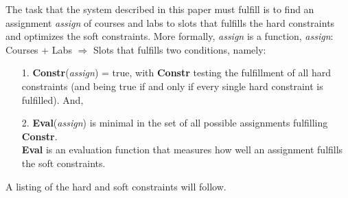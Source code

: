 \documentclass[10pt, oneside]{article}   	%
\begin{document}
\par The task that the system described in this paper must fulfill is to find an assignment \textit{assign} of courses and labs to slots that fulfills the hard constraints and optimizes the soft constraints. More formally, \textit{assign} is a function, \textit{assign}: Courses + Labs $\Rightarrow$ Slots that fulfills two conditions, namely:
\begin{itemize}[topsep=0pt]
\item[1.] \textbf{Constr}(\textit{assign}) = true, with \textbf{Constr} testing the fulfillment of all hard constraints (and being true if and only if every single hard constraint is fulfilled). And,
\item[2.] \textbf{Eval}(\textit{assign}) is minimal in the set of all possible assignments fulfilling \textbf{Constr}. \\ \textbf{Eval} is an evaluation function that measures how well an assignment fulfills the soft constraints.
\end{itemize}

\noindent A listing of the hard and soft constraints will follow.
\end{document}

